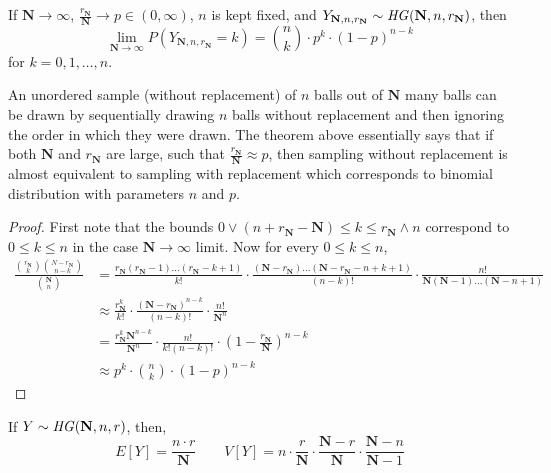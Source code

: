 \begin{theorem}
    If $\mathbf{N} \rightarrow \infty$, $\frac{r_\mathbf{N}}{\mathbf{N}}
\rightarrow p \in (0, \infty)$, $n$ is kept fixed, and $Y_{\mathbf{N}, n,
r_\mathbf{N}} \sim \text{\emph{HG}}(\mathbf{N}, n, r_\mathbf{N})$, then 
\[
    \lim_{\mathbf{N} \rightarrow \infty} P(Y_{\mathbf{N}, n, r_\mathbf{N}} = k)
  = {n \choose k} \cdot p^k \cdot (1 - p)^{n - k}
\]
for $k = 0, 1, \dots, n$.
\end{theorem}
\note An unordered sample (without replacement) of $n$ balls out of
$\mathbf{N}$ many balls can be drawn by sequentially drawing $n$ balls without
replacement and then ignoring the order in which they were drawn. The theorem
above essentially says that if both $\mathbf{N}$ and $r_\mathbf{N}$ are large,
such that $\frac{r_\mathbf{N}}{\mathbf{N}} \approx p$, then sampling without
replacement is almost equivalent to sampling with replacement which corresponds
to binomial distribution with parameters $n$ and $p$.
\begin{proof}
    First note that the bounds $0 \lor (n + r_\mathbf{N} - \mathbf{N}) \leq k
\leq r_\mathbf{N} \land n$ correspond to $0 \leq k \leq n$ in the case
$\mathbf{N} \rightarrow \infty$ limit. Now for every $0 \leq k \leq n$,
\begin{align*}
    \frac{{r_\mathbf{N} \choose k}{{N - r_\mathbf{N}} \choose {n -k}}}
         {{\mathbf{N} \choose n}}
 &= \frac{r_\mathbf{N} (r_\mathbf{N} - 1) \dots (r_\mathbf{N} - k + 1)}{k!}
    \cdot
    \frac{(\mathbf{N} - r_\mathbf{N}) \dots (\mathbf{N} - r_\mathbf{N} - n
         + k + 1)}{(n-k)!}
    \cdot
    \frac{n!}{\mathbf{N}(\mathbf{N} - 1) \dots (\mathbf{N} - n + 1)}         \\
 &\approx \frac{r_\mathbf{N}^k}{k!} \cdot
          \frac{(\mathbf{N} - r_\mathbf{N})^{n - k}}{(n - k)!} \cdot
          \frac{n!}{\mathbf{N}^n}                                            \\
 &= \frac{r_\mathbf{N}^k \mathbf{N}^{n - k}}{\mathbf{N}^n} \cdot
    \frac{n!}{k! (n - k)!} \cdot
    (1 - \frac{r_\mathbf{N}}{\mathbf{N}})^{n - k}                            \\
 &\approx p^k \cdot {n \choose k} \cdot (1 - p)^{n - k}
\end{align*}
\end{proof}

\begin{theorem}
    If $Y \sim \text{\emph{HG}}(\mathbf{N}, n, r)$, then,
    \[ E[Y] = \frac{n \cdot r}{\mathbf{N}} \qquad
       V[Y] = n \cdot 
              \frac{r}{\mathbf{N}} \cdot 
              \frac{\mathbf{N} - r}{\mathbf{N}} \cdot
              \frac{\mathbf{N} - n}{\mathbf{N} - 1}                          \]
\end{theorem}